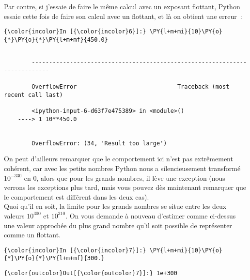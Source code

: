 Par contre, si j'essaie de faire le même calcul avec un exposant
flottant, Python essaie cette fois de faire son calcul avec un flottant,
et là on obtient une erreur~:

    \begin{Verbatim}[commandchars=\\\{\}]
{\color{incolor}In [{\color{incolor}6}]:} \PY{l+m+mi}{10}\PY{o}{*}\PY{o}{*}\PY{l+m+mf}{450.0}
\end{Verbatim}


    \begin{Verbatim}[commandchars=\\\{\}]

        ---------------------------------------------------------------------------

        OverflowError                             Traceback (most recent call last)

        <ipython-input-6-d63f7e475389> in <module>()
    ----> 1 10**450.0
    

        OverflowError: (34, 'Result too large')

    \end{Verbatim}

    On peut d'ailleurs remarquer que le comportement ici n'est pas
extrêmement cohérent, car avec les petits nombres Python nous a
silencieusement transformé \(10^{-330}\) en \(0\), alors que pour les
grands nombres, il lève une exception (nous verrons les exceptions plus
tard, mais vous pouvez dès maintenant remarquer que le comportement est
différent dans les deux cas).\\

    Quoi qu'il en soit, la limite pour les grands nombres se situe entre les
deux valeurs \(10^{300}\) et \(10^{310}\). On vous demande à nouveau
d'estimer comme ci-dessus une valeur approchée du plus grand nombre
qu'il soit possible de représenter comme un flottant.

    \begin{Verbatim}[commandchars=\\\{\}]
{\color{incolor}In [{\color{incolor}7}]:} \PY{l+m+mi}{10}\PY{o}{*}\PY{o}{*}\PY{l+m+mf}{300.}
\end{Verbatim}


\begin{Verbatim}[commandchars=\\\{\}]
{\color{outcolor}Out[{\color{outcolor}7}]:} 1e+300
\end{Verbatim}
            
